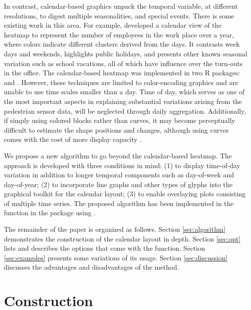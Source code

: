 \documentclass[article]{jss}
\theoremstyle{definition}
\theoremstyle{definition}
\theoremstyle{definition}
\theoremstyle{remark}
\begin{document}
In contrast, calendar-based graphics unpack the temporal variable, at
different resolutions, to digest multiple seasonalities, and special
events. There is some existing work in this area. For example,
\citet{VanWijkCluster1999} developed a calendar view of the heatmap to
represent the number of employees in the work place over a year, where
colors indicate different clusters derived from the days. It contrasts
week days and weekends, highlights public holidays, and presents other
known seasonal variation such as school vacations, all of which have
influence over the turn-outs in the office. The calendar-based heatmap
was implemented in two R packages: 
\citep{R-ggTimeSeries} and  \citep{R-ggcal}. However, these
techniques are limited to color-encoding graphics and are unable to use
time scales smaller than a day. Time of day, which serves as one of the
most important aspects in explaining substantial variations arising from
the pedestrian sensor data, will be neglected through daily aggregation.
Additionally, if simply using colored blocks rather than curves, it may
become perceptually difficult to estimate the shape positions and
changes, although using curves comes with the cost of more display
capacity \citep{cleveland1984graphical, lam2007overview}.

We propose a new algorithm to go beyond the calendar-based heatmap. The
approach is developed with three conditions in mind: (1) to display
time-of-day variation in addition to longer temporal components such as
day-of-week and day-of-year; (2) to incorporate line graphs and other
types of glyphs into the graphical toolkit for the calendar layout; (3)
to enable overlaying plots consisting of multiple time series. The
proposed algorithm has been implemented in the 
function in the  package \citep{R-sugrrants} using
 \citep{R-base}.

The remainder of the paper is organized as follows. Section
\ref{sec:algorithm} demonstrates the construction of the calendar layout
in depth. Section \ref{sec:opt} lists and describes the options that
come with the  function. Section \ref{sec:examples}
presents some variations of its usage. Section \ref{sec:discussion}
discusses the advantages and disadvantages of the method.

\section{Construction}\label{construction}
\end{document}
